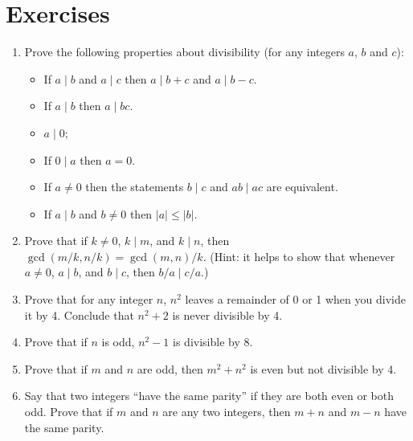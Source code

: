 \documentclass[letterpaper,10pt,english]{sphinxmanual}
\begin{document}
\section{Exercises}
\label{\detokenize{elementary_number_theory:exercises}}\begin{enumerate}
%
\item {} 
\sphinxAtStartPar
Prove the following properties about divisibility (for any integers \(a\), \(b\) and \(c\)):
\begin{itemize}
\item {} 
\sphinxAtStartPar
If \(a \mid b\) and \(a \mid c\) then \(a \mid b + c\) and \(a \mid b - c\).

\item {} 
\sphinxAtStartPar
If \(a \mid b\) then \(a \mid bc\).

\item {} 
\sphinxAtStartPar
\(a \mid 0\);

\item {} 
\sphinxAtStartPar
If \(0 \mid a\) then \(a = 0\).

\item {} 
\sphinxAtStartPar
If \(a \neq 0\) then the statements \(b \mid c\) and \(ab \mid ac\) are equivalent.

\item {} 
\sphinxAtStartPar
If \(a \mid b\) and \(b \neq 0\) then \(|a| \leq |b|\).

\end{itemize}

\item {} 
\sphinxAtStartPar
Prove that if \(k \ne 0\), \(k \mid m\), and \(k \mid n\), then \(\gcd(m / k, n / k) = \gcd(m, n) / k\). (Hint: it helps to show that whenever \(a \ne 0\), \(a \mid b\), and \(b \mid c\), then \(b / a \mid c / a\).)

\item {} 
\sphinxAtStartPar
Prove that for any integer \(n\), \(n^2\) leaves a remainder of 0 or 1 when you divide it by 4. Conclude that \(n^2 + 2\) is never divisible by 4.

\item {} 
\sphinxAtStartPar
Prove that if \(n\) is odd, \(n^2 - 1\) is divisible by 8.

\item {} 
\sphinxAtStartPar
Prove that if \(m\) and \(n\) are odd, then \(m^2 + n^2\) is even but not divisible by 4.

\item {} 
\sphinxAtStartPar
Say that two integers “have the same parity” if they are both even or both odd. Prove that if \(m\) and \(n\) are any two integers, then \(m + n\) and \(m - n\) have the same parity.


\end{enumerate}
\end{document}
